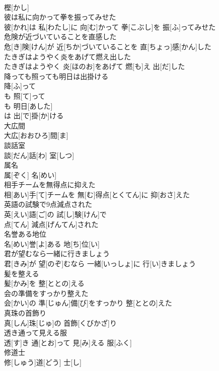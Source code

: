 \documentclass[8pt]{extreport}
\begin{document}
\begin{CJK}{UTF8}{min}
\\	樫[かし]
\\	彼は私に向かって拳を振ってみせた	
\\	彼[かれ]は 私[わたし]に 向[む]かって 拳[こぶし]を 振[ふ]ってみせた
\\	危険が近づいていることを直感した	
\\	危[き]険[けん]が 近[ちか]づいていることを 直[ちょっ]感[かん]した
\\	たきぎはようやく炎をあげて燃え出した	
\\	たきぎはようやく 炎[ほのお]をあげて 燃[も]え 出[だ]した
\\	降っても照っても明日は出掛ける	
\\	降[ふ]って 
\\	も 照[て]って 
\\	も 明日[あした]
\\	は 出[で]掛[か]ける 
\\	大広間	
\\	大広[おおひろ]間[ま]
\\	談話室	
\\	談[だん]話[わ] 室[しつ]
\\	属名	
\\	属[ぞく] 名[めい]
\\	相手チームを無得点に抑えた	
\\	相[あい]手[て]チームを 無[む]得点[とくてん]に 抑[おさ]えた
\\	英語の試験で9点減点された	
\\	英[えい]語[ご]の 試[し]験[けん]で 
\\	点[てん] 減点[げんてん]された
\\	名誉ある地位	
\\	名[めい]誉[よ]ある 地[ち]位[い]
\\	君が望むなら一緒に行きましょう	
\\	君[きみ]が 望[のぞ]むなら 一緒[いっしょ]に 行[い]きましょう
\\	髪を整える	
\\	髪[かみ]を 整[ととの]える
\\	会の準備をすっかり整えた	
\\	会[かい]の 準[じゅん]備[び]をすっかり 整[ととの]えた
\\	真珠の首飾り	
\\	真[しん]珠[じゅ]の 首飾[くびかざ]り
\\	透き通って見える服	
\\	透[す]き 通[とお]って 見[み]える 服[ふく]
\\	修道士	
\\	修[しゅう]道[どう] 士[し]

\end{CJK}
\end{document}
